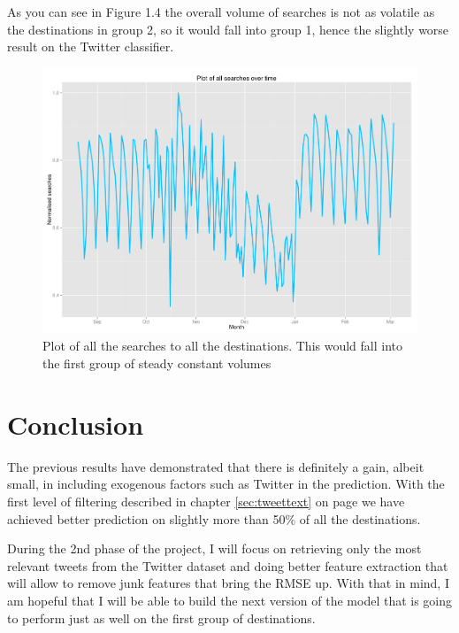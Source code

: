 \documentclass[minf,frontabs,twoside,singlespacing,parskip]{infthesis}
\begin{document}
As you can see in Figure 1.4 the overall volume of searches is not as volatile as the destinations in group 2, so it would fall into group 1, hence the slightly worse result on the Twitter classifier.

\begin{figure}[h]
\begin{center}
\includegraphics[width=\textwidth]{overall}
\end{center}
\caption{Plot of all the searches to all the destinations. This would fall into the first group of steady constant volumes}
\end{figure}

%

\section{Conclusion}

The previous results have demonstrated that there is definitely a gain, albeit small, in including exogenous factors such as Twitter in the prediction. With the first level of filtering described in chapter \ref{sec:tweettext} on page \pageref{sec:tweettext} we have achieved better prediction on slightly more than 50\% of all the destinations.  


During the 2nd phase of the project, I will focus on retrieving only the most relevant tweets from the Twitter dataset and doing better feature extraction that will allow to remove junk features that bring the RMSE up. With that in mind, I am hopeful that I will be able to build the next version of the model that is going to perform just as well on the first group of destinations. 
\end{document}

